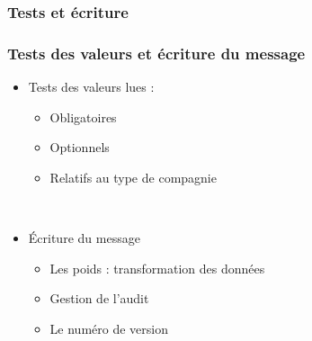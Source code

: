 \subsubsection{Tests et écriture}

\begin{frame}
	\frametitle{Tests des valeurs et écriture du message}
	
	\begin{itemize}
		\item Tests des valeurs lues :
			\begin{itemize}
				\item Obligatoires
				\item Optionnels
				\item Relatifs au type de compagnie
			\end{itemize}~
			
		\item \'Ecriture du message
			\begin{itemize}
				\item Les poids : transformation des données\sautligne
				
				\item Gestion de l'audit
				\item Le numéro de version
			\end{itemize}
	\end{itemize}
\end{frame}
